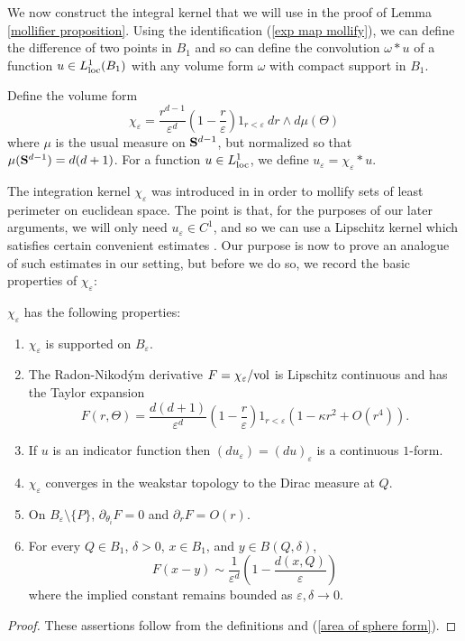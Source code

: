 We now construct the integral kernel that we will use in the proof of Lemma \ref{mollifier proposition}.
Using the identification (\ref{exp map mollify}), we can define the difference of two points in $B_1$ and so can define the convolution $\omega * u$ of a function $u \in L^1_{\mathrm{loc}}(B_1)$ with any volume form $\omega$ with compact support in $B_1$.

\begin{definition}
Define the volume form
$$\chi_\varepsilon = \frac{r^{d - 1}}{\varepsilon^d}\left(1 - \frac{r}{\varepsilon}\right)1_{r < \varepsilon} ~dr \wedge d\mu(\Theta)$$
where $\mu$ is the usual measure on $\mathbf S^{d - 1}$, but normalized so that $\mu(\mathbf S^{d - 1}) = d(d + 1)$.
For a function $u \in L^1_{\mathrm{loc}}$, we define $u_\varepsilon = \chi_\varepsilon * u$.
\end{definition}

The integration kernel $\chi_\varepsilon$ was introduced in \cite[Chapter 7]{Giusti77} in order to mollify sets of least perimeter on euclidean space.
The point is that, for the purposes of our later arguments, we will only need $u_\varepsilon \in C^1$, and so we can use a Lipschitz kernel which satisfies certain convenient estimates \cite[Lemmata 7.1--7.2]{Giusti77}.
Our purpose is now to prove an analogue of such estimates in our setting, but before we do so, we record the basic properties of $\chi_\varepsilon$:

\begin{lemma}\label{mollifier props}
$\chi_\varepsilon$ has the following properties:
\begin{enumerate}
\item $\chi_\varepsilon$ is supported on $B_\varepsilon$.
\item The Radon-Nikod\'ym derivative $F = \chi_\varepsilon/\mathrm{vol}$ is Lipschitz continuous and has the Taylor expansion
\begin{equation}\label{RN mollify}
F(r, \Theta) = \frac{d(d + 1)}{\varepsilon^d} \left(1 - \frac{r}{\varepsilon}\right) 1_{r < \varepsilon}(1 - \kappa r^2 + O(r^4)).
\end{equation}
\item If $u$ is an indicator function then $(du_\varepsilon) = (du)_\varepsilon$ is a continuous $1$-form.
\item $\chi_\varepsilon$ converges in the weakstar topology to the Dirac measure at $Q$.
\item On $B_\varepsilon \setminus \{P\}$, $\partial_{\theta_i} F = 0$ and $\partial_r F = O(r)$.
\item For every $Q \in B_1$, $\delta > 0$, $x \in B_1$, and $y \in B(Q, \delta)$,
\begin{equation}\label{approximation of mollifier 2}
F(x - y) \sim \frac{1}{\varepsilon^d}\left(1 - \frac{d(x, Q)}{\varepsilon}\right)
\end{equation}
where the implied constant remains bounded as $\varepsilon,\delta \to 0$.
\end{enumerate}
\end{lemma}
\begin{proof}
These assertions follow from the definitions and (\ref{area of sphere form}).
\end{proof}

